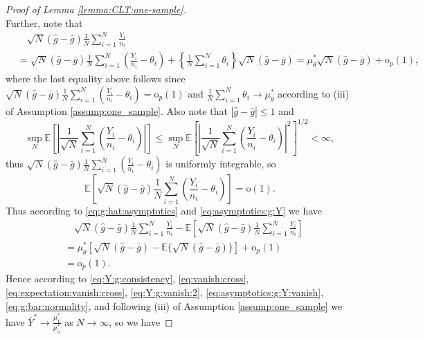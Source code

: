 \documentclass[12pt,letterpaper]{article}
\begin{document}
\begin{proof}[Proof of Lemma \ref{lemma:CLT:one-sample}]
\begin{equation}
\end{equation}
Further, note that 
\begin{equation}\label{eq:asymptotics:g:Y}
\begin{array}{rl}
&\quad\displaystyle\sqrt{N}(\hat{g}-\bar{g})\frac{1}{N}\sum_{i=1}^N\frac{Y_i}{n_i}\\
&=\displaystyle\sqrt{N}(\hat{g}-\bar{g})\frac{1}{N}\sum_{i=1}^N\left(\frac{Y_i}{n_i}-\theta_i\right)+\left\{\frac{1}{N}\sum_{i=1}^N\theta_i\right\}\sqrt{N}(\hat{g}-\bar{g})=\mu_{\theta}^*\sqrt{N}(\hat{g}-\bar{g})+\mathrm{o}_p(1),
\end{array}
\end{equation}
where the last equality above follows since $\displaystyle\sqrt{N}(\hat{g}-\bar{g})\frac{1}{N}\sum_{i=1}^N\left(\frac{Y_i}{n_i}-\theta_i\right)=\mathrm{o}_p(1)$ and $\displaystyle\frac{1}{N}\sum_{i=1}^N\theta_i\rightarrow\mu_{\theta}^*$ according to (iii) of Assumption \ref{assump:one_sample}. Also note that $|\hat{g}-\bar{g}|\leq1$ and $$\sup_N\mathbb{E}\left[\left|\frac{1}{\sqrt{N}}\sum_{i=1}^N\left(\frac{Y_i}{n_i}-\theta_i\right)\right|\right]\leq\sup_N\mathbb{E}\left[\left|\frac{1}{\sqrt{N}}\sum_{i=1}^N\left(\frac{Y_i}{n_i}-\theta_i\right)\right|^2\right]^{1/2}<\infty,$$ thus $\displaystyle\sqrt{N}(\hat{g}-\bar{g})\frac{1}{N}\sum_{i=1}^N\left(\frac{Y_i}{n_i}-\theta_i\right)$ is uniformly integrable, so 
$$\mathbb{E}\left[\sqrt{N}(\hat{g}-\bar{g})\frac{1}{N}\sum_{i=1}^N\left(\frac{Y_i}{n_i}-\theta_i\right)\right]=\mathrm{o}(1).$$ 
Thus according to \eqref{eq:g:hat:asymptotics} and \eqref{eq:asymptotics:g:Y} we have 
\begin{equation}\label{eq:asymptotics:g:Y:vanish}
\begin{array}{rl}
&\displaystyle\quad\sqrt{N}(\hat{g}-\bar{g})\frac{1}{N}\sum_{i=1}^N\frac{Y_i}{n_i}-\mathbb{E}\left[\sqrt{N}(\hat{g}-\bar{g})\frac{1}{N}\sum_{i=1}^N\frac{Y_i}{n_i}\right]\\
&\displaystyle=\mu_{\theta}^*\left[\sqrt{N}(\hat{g}-\bar{g})-\mathbb{E}\{\sqrt{N}(\hat{g}-\bar{g})\}\right]+\mathrm{o}_p(1)\\
&\displaystyle=\mathrm{o}_p(1).
\end{array}
\end{equation}
Hence according to \eqref{eq:Y:g:consistency}, \eqref{eq:vanish:cross}, \eqref{eq:expectation:vanish:cross}, \eqref{eq:Y:g:vanish:2}, \eqref{eq:asymptotics:g:Y:vanish}, \eqref{eq:g:bar:normality}, and following (iii) of Assumption \ref{assump:one_sample} we have $\displaystyle\bar{Y}^*\rightarrow\frac{\mu_Y^*}{\mu_n^*}$ as $N\rightarrow\infty$, so we have 

\end{proof}
\end{document}
